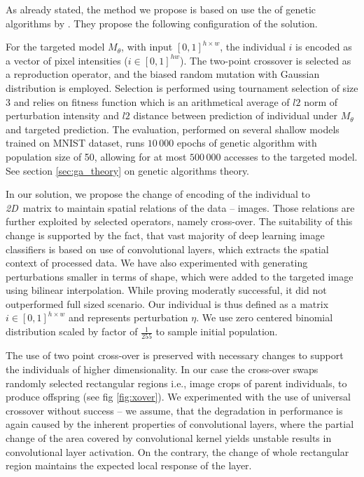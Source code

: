 As already stated, the method we propose is based on use the of genetic algorithms by \cite{Vidnerova:2016:EGA:2955129.2955178}. They propose the following configuration of the solution.

For the targeted model $M_\theta$, with input $[0,1]^{h \times w}$, the individual $i$ is encoded as a vector of pixel intensities ($i \in [0, 1]^{h w}$). The two-point crossover is selected as a reproduction operator, and the biased random mutation with Gaussian distribution is employed. Selection is performed using tournament selection of size 3 and relies on fitness function which is an arithmetical average of $l2$ norm of perturbation intensity and $l2$ distance between prediction of individual under $M_\theta$ and targeted prediction. The evaluation, performed on several shallow models trained on MNIST dataset, runs $10\,000$ epochs of genetic algorithm with population size of 50, allowing for at most $500\,000$ accesses to the targeted model. See section \ref{sec:ga_theory} on genetic algorithms theory.

In our solution, we propose the change of encoding of the individual to \emph{2D}~matrix to maintain spatial relations of the data -- images. Those relations are further exploited by selected operators, namely cross-over. The suitability of this change is supported by the fact, that vast majority of deep learning image classifiers is based on use of convolutional layers, which extracts the spatial context of processed data. We have also experimented with generating perturbations smaller in terms of shape, which were added to the targeted image using bilinear interpolation. While proving moderatly successful, it did not outperformed full sized scenario. Our individual is thus defined as a matrix $i \in [0, 1]^{h \times w}$ and represents perturbation $\eta$. We use zero centered binomial distribution scaled by factor of $\frac{1}{255}$ to sample initial population.

The use of two point cross-over is preserved with necessary changes to support the individuals of higher dimensionality. In our case the cross-over swaps randomly selected rectangular regions i.e., image crops of parent individuals, to produce offspring (see fig \ref{fig:xover}). We experimented with the use of universal crossover without success -- we assume, that the degradation in performance is again caused by the inherent properties of convolutional layers, where the partial change of the area covered by convolutional kernel yields unstable results in convolutional layer activation. On the contrary, the change of whole rectangular region maintains the expected local response of the layer.

